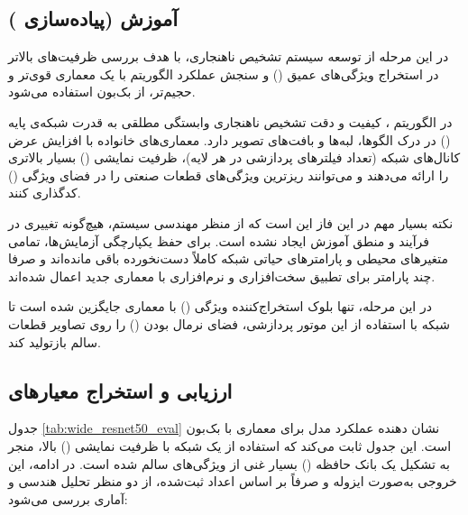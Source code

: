 \documentclass{article}
\begin{document}
\subsection{آموزش  (پیاده‌سازی )}


در این مرحله از توسعه سیستم تشخیص ناهنجاری، با هدف بررسی ظرفیت‌های بالاتر در استخراج ویژگی‌های عمیق () و سنجش عملکرد الگوریتم با یک معماری قوی‌تر و حجیم‌تر، از بک‌بون  استفاده می‌شود.

در الگوریتم ، کیفیت و دقت تشخیص ناهنجاری وابستگی مطلقی به قدرت شبکه‌ی پایه () در درک الگوها، لبه‌ها و بافت‌های تصویر دارد. معماری‌های خانواده  با افزایش عرض کانال‌های شبکه (تعداد فیلترهای پردازشی در هر لایه)، ظرفیت نمایشی () بسیار بالاتری را ارائه می‌دهند و می‌توانند ریزترین ویژگی‌های قطعات صنعتی را در فضای ویژگی () کدگذاری کنند.


نکته بسیار مهم در این فاز این است که از منظر مهندسی سیستم، هیچ‌گونه تغییری در فرآیند و منطق آموزش ایجاد نشده است. برای حفظ یکپارچگی آزمایش‌ها، تمامی متغیرهای محیطی و پارامترهای حیاتی شبکه کاملاً دست‌نخورده باقی مانده‌اند و صرفا چند پارامتر برای تطبیق سخت‌افزاری و نرم‌افزاری با معماری جدید اعمال شده‌اند.

در این مرحله، تنها بلوک استخراج‌کننده ویژگی () با معماری  جایگزین شده است تا شبکه با استفاده از این موتور پردازشی، فضای نرمال بودن () را روی تصاویر قطعات سالم بازتولید کند.

\subsection{ارزیابی و استخراج معیارهای }
\label{subsec:RS50}

جدول \ref{tab:wide_resnet50_eval} نشان دهنده عملکرد مدل برای معماری  با بک‌بون   است. این جدول ثابت می‌کند که استفاده از یک شبکه با ظرفیت نمایشی () بالا، منجر به تشکیل یک بانک حافظه () بسیار غنی از ویژگی‌های سالم شده است. در ادامه، این خروجی به‌صورت ایزوله و صرفاً بر اساس اعداد ثبت‌شده، از دو منظر تحلیل هندسی و آماری بررسی می‌شود:
\end{document}
